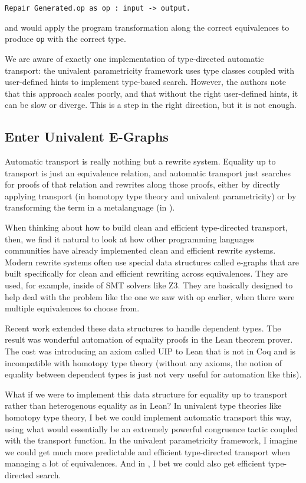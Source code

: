 \begin{lstlisting}
Repair Generated.op as op : input -> output.
\end{lstlisting}
and \toolname would apply the program transformation along the correct equivalences
to produce \lstinline{op} with the correct type.

We are aware of exactly one implementation of type-directed automatic transport:
the univalent parametricity framework uses type classes coupled with user-defined hints to implement type-based search.
However, the authors note that this approach scales poorly, and that without the right user-defined
hints, it can be slow or diverge.
This is a step in the right direction, but it is not enough.

\subsection{Enter Univalent E-Graphs}
\label{sec:key}

Automatic transport is really nothing but a rewrite system.
Equality up to transport is just an equivalence relation, and automatic transport just searches for proofs of that relation and rewrites along those proofs, either by directly applying transport (in homotopy type theory and univalent parametricity) or by transforming the term in a metalanguage (in \toolname).

When thinking about how to build clean and efficient type-directed transport, then, we find it natural to look
at how other programming languages communities have already implemented clean and efficient rewrite systems.
Modern rewrite systems often use special data structures called e-graphs that are built specifically
for clean and efficient rewriting across equivalences.
They are used, for example, inside of SMT solvers like Z3.
They are basically designed to help deal with the problem like the one we saw with op earlier, when there were multiple equivalences to 
choose from.

Recent work extended these data structures to handle dependent types. The result was wonderful automation of equality proofs in the Lean theorem prover. The cost was introducing an axiom called UIP to Lean that is not in Coq and is incompatible with homotopy type theory (without any axioms, the notion of equality between dependent types is just not very useful for automation like this).

What if we were to implement this data structure for equality up to transport rather than heterogenous equality as in Lean? In univalent type theories like homotopy type theory, I bet we could implement automatic transport this way, using what would essentially be an extremely powerful congruence tactic coupled with the transport function. In the univalent parametricity framework, I imagine we could get much more predictable and efficient type-directed transport when managing a lot of equivalences. And in \toolname, I bet we could also get efficient type-directed search.

